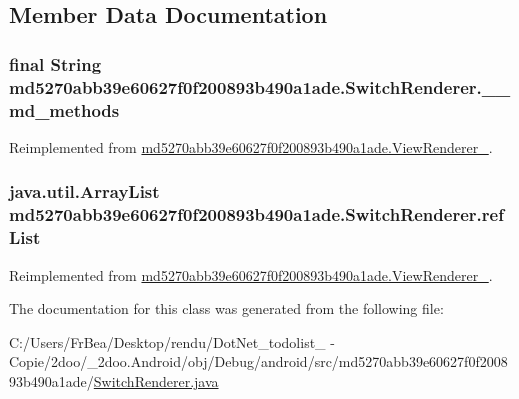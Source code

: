 \subsection{Member Data Documentation}
\hypertarget{classmd5270abb39e60627f0f200893b490a1ade_1_1_switch_renderer_70baf7daa85c86b196cc9c27e5478a8c}{
\subsubsection[{\_\-\_\-md\_\-methods}]{\setlength{\rightskip}{0pt plus 5cm}final String {\bf md5270abb39e60627f0f200893b490a1ade.SwitchRenderer.\_\-\_\-md\_\-methods}}}
\label{classmd5270abb39e60627f0f200893b490a1ade_1_1_switch_renderer_70baf7daa85c86b196cc9c27e5478a8c}




Reimplemented from \hyperlink{classmd5270abb39e60627f0f200893b490a1ade_1_1_view_renderer__2_c66b6f41d2afba0df6ae890c8f2b644b}{md5270abb39e60627f0f200893b490a1ade.ViewRenderer\_}.\hypertarget{classmd5270abb39e60627f0f200893b490a1ade_1_1_switch_renderer_a9fe52d28f98ed4682e97e2a914a77b5}{
\subsubsection[{refList}]{\setlength{\rightskip}{0pt plus 5cm}java.util.ArrayList {\bf md5270abb39e60627f0f200893b490a1ade.SwitchRenderer.refList}}}
\label{classmd5270abb39e60627f0f200893b490a1ade_1_1_switch_renderer_a9fe52d28f98ed4682e97e2a914a77b5}




Reimplemented from \hyperlink{classmd5270abb39e60627f0f200893b490a1ade_1_1_view_renderer__2_489e61f24650a22849fddacb3f498a6b}{md5270abb39e60627f0f200893b490a1ade.ViewRenderer\_}.

The documentation for this class was generated from the following file:\begin{CompactItemize}
\item 
C:/Users/FrBea/Desktop/rendu/DotNet\_\-todolist\_ - Copie/2doo/\_\-2doo.Android/obj/Debug/android/src/md5270abb39e60627f0f200893b490a1ade/\hyperlink{md5270abb39e60627f0f200893b490a1ade_2_switch_renderer_8java}{SwitchRenderer.java}\end{CompactItemize}
